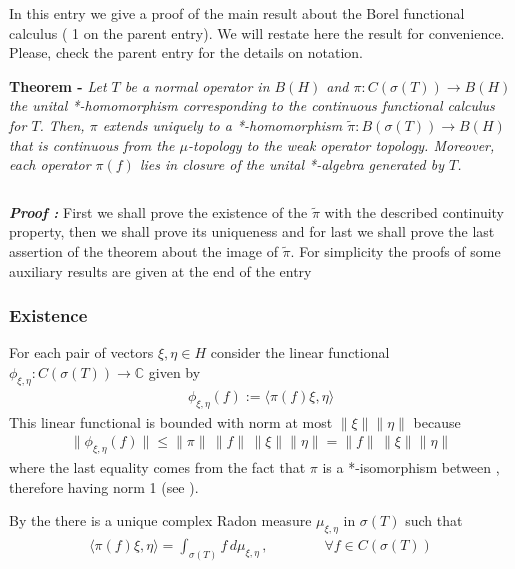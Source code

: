 \documentclass[12pt]{article}
\begin{document}

In this entry we give a proof of the main result about the Borel functional calculus ( 1 on the parent entry). We will restate here the result for convenience. Please, check the parent entry for the details on notation. 

{\bf Theorem -} \emph{Let $T$ be a normal operator in $B(H)$ and $\pi:C(\sigma(T)) \longrightarrow B(H)$ the unital *-homomorphism corresponding to the continuous functional calculus for $T$. Then, $\pi$ extends uniquely to a *-homomorphism $\widetilde{\pi}: B(\sigma(T)) \longrightarrow B(H)$ that is continuous from the $\mu$-topology to the weak operator topology. Moreover, each operator $\pi(f)$ lies in  closure of the unital *-algebra generated by $T$.}

$\,$

{\bf \emph{Proof :}} First we shall prove the existence of the  $\widetilde{\pi}$ with the described continuity property, then we shall prove its uniqueness and for last we shall prove the last assertion of the theorem about the image of $\widetilde{\pi}$. For simplicity the proofs of some auxiliary results are given at the end of the entry

\subsubsection{Existence}

For each pair of vectors $\xi, \eta \in H$ consider the linear functional $\phi_{\xi, \eta} : C(\sigma(T)) \to \mathbb{C}$ given by
\begin{align*}
\phi_{\xi, \eta}(f) := \langle \pi(f) \xi, \eta \rangle
\end{align*}
This linear functional is bounded with norm at most $\| \xi\| \|\eta \|$ because
\begin{align*}
\|\phi_{\xi, \eta}(f)\| \leq \|\pi\|\,\|f\|\, \|\xi\| \|\eta \| = \|f\|\, \|\xi\| \|\eta \|
\end{align*}
where the last equality comes from the fact that $\pi$ is a *-isomorphism between , therefore having norm 1 (see ).

By the  there is a unique complex Radon measure $\mu_{\xi, \eta}$ in $\sigma(T)$ such that
\begin{align}
\langle \pi(f) \xi, \eta \rangle = \int_{\sigma(T)} f \,d\mu_{\xi, \eta}\,, \qquad\qquad \forall f \in C(\sigma(T))
\end{align}
\end{document}
